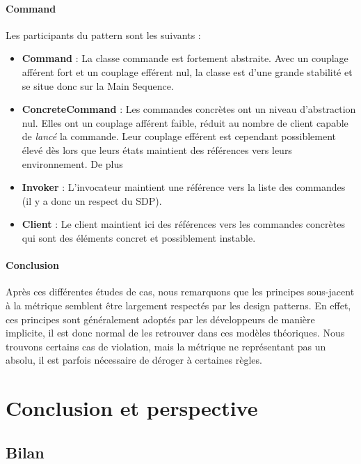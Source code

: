 \documentclass{scrartcl}
\begin{document}
    \paragraph{Command}Les participants du pattern sont les suivants :
    \begin{itemize}
        \item \textbf{Command} : La classe commande est fortement abstraite. Avec un couplage afférent fort et un couplage efférent nul, la classe est d'une grande stabilité et se situe donc sur la Main Sequence.
        \item \textbf{ConcreteCommand} : Les commandes concrètes ont un niveau d'abstraction nul. Elles ont un couplage afférent faible, réduit au nombre de client capable de \emph{lancé} la commande. Leur couplage efférent est cependant possiblement élevé dès lors que leurs états maintient des références vers leurs environnement. De plus 
        \item \textbf{Invoker} : L'invocateur maintient une référence vers la liste des commandes (il y a donc un respect du SDP).
        \item \textbf{Client} : Le client maintient ici des références vers les commandes concrètes qui sont des éléments concret et possiblement instable.
    \end{itemize}
    
    \paragraph{Conclusion}Après ces différentes études de cas, nous remarquons que les principes sous-jacent à la métrique semblent être largement respectés par les design patterns. En effet, ces principes sont généralement adoptés par les développeurs de manière implicite, il est donc normal de les retrouver dans ces modèles théoriques. Nous trouvons certains cas de violation, mais la métrique ne représentant pas un absolu, il est parfois nécessaire de déroger à certaines règles.


\newpage
\section{Conclusion et perspective}
\subsection{Bilan}
\end{document}
